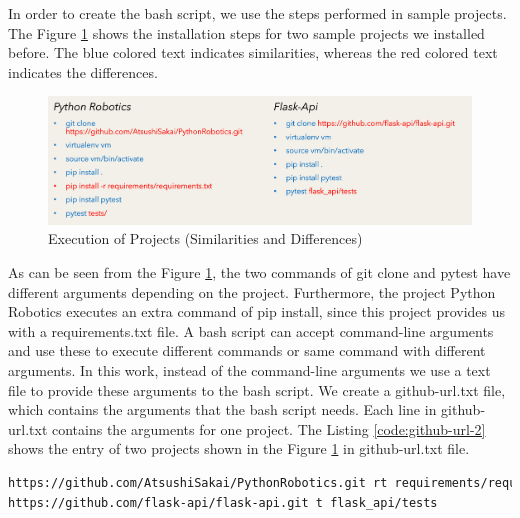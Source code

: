 In order to create the bash script, we use the steps performed in sample projects. 
The Figure \ref{fig:setup difference} shows the installation steps for two sample projects we installed before.
The blue colored text indicates similarities, whereas the red colored text indicates the differences.
\begin{figure}[ht]
    \centering
    \includegraphics[width=1\linewidth]{figures/implementation/Setup-difference.png}
    \caption{Execution of Projects (Similarities and Differences)}
    \label{fig:setup difference}
\end{figure}
As can be seen from the Figure \ref{fig:setup difference}, the two commands of git clone and pytest have different arguments depending on the project.
Furthermore, the project Python Robotics executes an extra command of pip install, since this project provides us with a requirements.txt file.
A bash script can accept command-line arguments and use these to execute different commands or same command with different arguments.
In this work, instead of the command-line arguments we use a text file to provide these arguments to the bash script.
We create a github-url.txt file, which contains the arguments that the bash script needs.
Each line in github-url.txt contains the arguments for one project.
The Listing \ref{code:github-url-2} shows the entry of two projects shown in the Figure \ref{fig:setup difference} in github-url.txt file.
\lstset{numbers=left, numberstyle=\tiny, stepnumber=1, numbersep=5pt, columns=flexible, breaklines=true}
\lstset{basicstyle=\ttfamily}
\lstset{frame=tb}
\begin{lstlisting}[float,caption=Sample Entry github-url.txt,label=code:github-url-2,language=Bash]
https://github.com/AtsushiSakai/PythonRobotics.git rt requirements/requirements.txt tests
https://github.com/flask-api/flask-api.git t flask_api/tests
\end{lstlisting}

